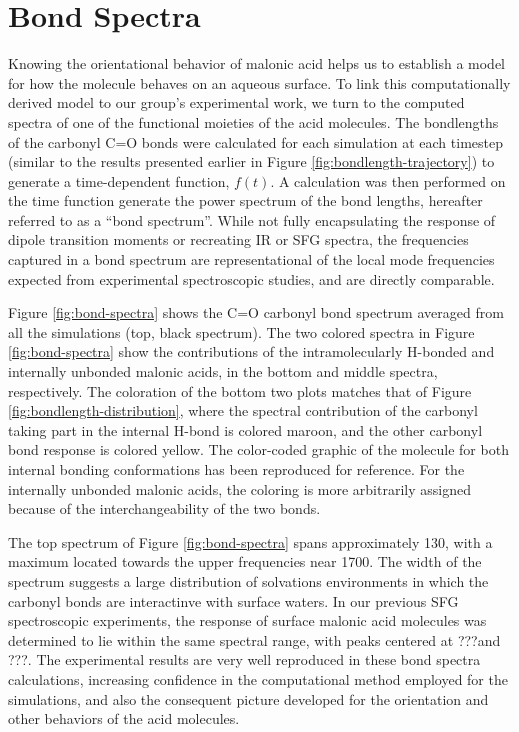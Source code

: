 \section {Bond Spectra}

Knowing the orientational behavior of malonic acid helps us to establish a model for how the molecule behaves on an aqueous surface. To link this computationally derived model to our group's experimental work, we turn to the computed spectra of one of the functional moieties of the acid molecules. The bondlengths of the carbonyl C=O bonds were calculated for each simulation at each timestep (similar to the results presented earlier in Figure \ref{fig:bondlength-trajectory}) to generate a time-dependent function, $f(t)$. A calculation was then performed on the time function generate the power spectrum of the bond lengths,\cite{BuchPaper,Etc} hereafter referred to as a ``bond spectrum''. While not fully encapsulating the response of dipole transition moments or recreating IR or SFG spectra, the frequencies captured in a bond spectrum are representational of the local mode frequencies expected from experimental spectroscopic studies, and are directly comparable.

Figure \ref{fig:bond-spectra} shows the C=O carbonyl bond spectrum averaged from all the simulations (top, black spectrum). The two colored spectra in Figure \ref{fig:bond-spectra} show the contributions of the intramolecularly H-bonded and internally unbonded malonic acids, in the bottom and middle spectra, respectively. The coloration of the bottom two plots matches that of Figure \ref{fig:bondlength-distribution}, where the spectral contribution of the carbonyl taking part in the internal H-bond is colored maroon, and the other carbonyl bond response is colored yellow. The color-coded graphic of the molecule for both internal bonding conformations has been reproduced for reference. For the internally unbonded malonic acids, the coloring is more arbitrarily assigned because of the interchangeability of the two bonds.

The top spectrum of Figure \ref{fig:bond-spectra} spans approximately 130\cm, with a maximum located towards the upper frequencies near 1700\cm. The width of the spectrum suggests a large distribution of solvations environments in which the carbonyl bonds are interactinve with surface waters. In our previous SFG spectroscopic experiments, the response of surface malonic acid molecules was determined to lie within the same spectral range, with peaks centered at ???\cm and ???\cm. The experimental results are very well reproduced in these bond spectra calculations, increasing confidence in the computational method employed for the simulations, and also the consequent picture developed for the orientation and other behaviors of the acid molecules.

